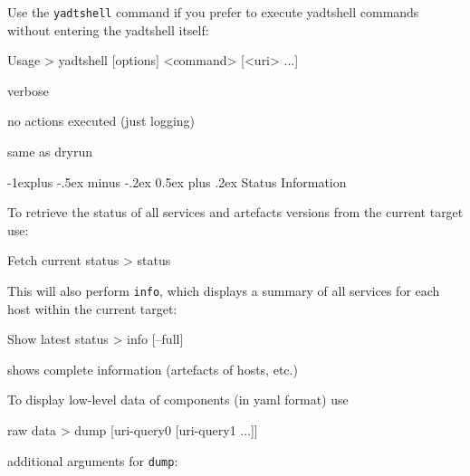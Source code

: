 \documentclass[10pt,landscape]{article}
\makeatletter
\renewcommand{\subsection}{\@startsection{subsection}{2}{0mm}%
                                {-1explus -.5ex minus -.2ex}%
                                {0.5ex plus .2ex}%
                                {\normalfont\normalsize\bfseries}}
\makeatother
\begin{document}
\begin{multicols}{3}
Use the \verb#yadtshell# command if you prefer to execute yadtshell commands
without entering the yadtshell itself:
\begin{commands}{Usage}
> yadtshell [options] <command> [<uri> ...]
\end{commands}

\begin{description}[font=\bfseries,leftmargin=1.5cm,style=sameline]
    \item [-v]       verbose
    \item [--dryrun] no actions executed (just logging)
    \item [-n]       same as dryrun
\end{description}



\subsection{Status Information}

To retrieve the status of all services and artefacts versions from the current
target use:
\begin{commands}{Fetch current status}
> status
\end{commands}

This will also perform \verb+info+, which displays a summary of all
services for each host within the current target:
\begin{commands}{Show latest status}
> info [--full]
\end{commands}

\begin{description}[font=\bfseries,leftmargin=1.5cm,style=sameline]
    \item [--full]     shows complete information (artefacts of hosts, etc.)
\end{description}

To display low-level data of components (in yaml format) use
\begin{commands}{raw data}
> dump [uri-query0 [uri-query1 ...]]
\end{commands}

additional arguments for \verb+dump+:
\begin{description}[font=\bfseries,leftmargin=1.5cm,style=sameline]
    \item [--attribute]
    \item [--show-pending-updates]
    \item [--show-current-artefacts]
\end{description}


\end{multicols}
\end{document}
